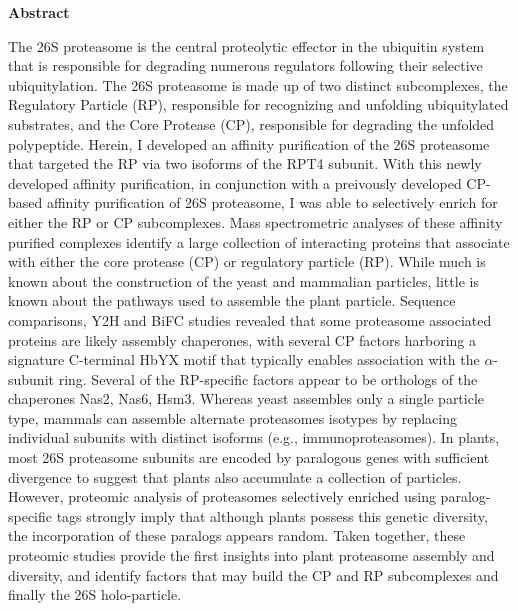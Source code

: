 \textbf{Abstract}

The 26S proteasome is the central proteolytic effector in the ubiquitin system that is responsible for degrading numerous regulators following their selective ubiquitylation. The 26S proteasome is made up of two distinct subcomplexes,
 the Regulatory Particle (RP), responsible for recognizing and unfolding ubiquitylated substrates, and the Core Protease (CP), responsible for degrading the unfolded polypeptide. 
Herein, I developed an affinity purification of the 26S proteasome that targeted the RP via two isoforms of the RPT4 subunit. With this newly developed affinity purification, in conjunction with a preivously developed CP-based affinity purification of 26S proteasome, I was able to selectively enrich for either the RP or CP subcomplexes.
Mass spectrometric analyses of these affinity purified complexes identify a large collection of interacting proteins that associate with either the core protease (CP) or regulatory particle (RP).
While much is known about the construction of the yeast and mammalian particles, little is known about the pathways used to assemble the plant particle.
Sequence comparisons, Y2H and BiFC studies revealed that some proteasome associated proteins are likely assembly chaperones, with several CP factors harboring a signature C-terminal HbYX motif that typically enables association with the $\alpha$-subunit ring.
Several of the RP-specific factors appear to be orthologs of the chaperones Nas2, Nas6, Hsm3.
Whereas yeast assembles only a single particle type, mammals can assemble alternate proteasomes isotypes by replacing individual subunits with distinct isoforms (e.g., immunoproteasomes).
In plants, most 26S proteasome subunits are encoded by paralogous genes with sufficient divergence to suggest that plants also accumulate a collection of particles.
However, proteomic analysis of proteasomes selectively enriched using paralog-specific tags strongly imply that although plants possess this genetic diversity, the incorporation of these paralogs appears random.
Taken together, these proteomic studies provide the first insights into plant proteasome assembly and diversity, and identify factors that may build the CP and RP subcomplexes and finally the 26S holo-particle.